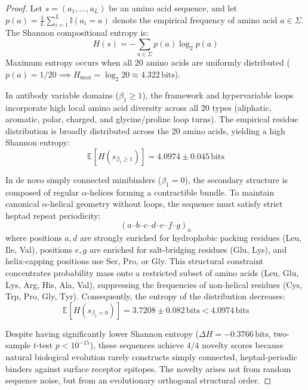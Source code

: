 \begin{proof}
Let $s = (a_1, \dots, a_L)$ be an amino acid sequence, and let $p(a) = \frac{1}{L} \sum_{i=1}^L \mathbb{I}(a_i = a)$ denote the empirical frequency of amino acid $a \in \Sigma$. The Shannon compositional entropy is:
\begin{equation}
    H(s) = -\sum_{a \in \Sigma} p(a) \log_2 p(a)
\end{equation}
Maximum entropy occurs when all 20 amino acids are uniformly distributed ($p(a) = 1/20 \implies H_{\max} = \log_2 20 \approx 4.322\,\text{bits}$).

In antibody variable domains ($\beta_1 \ge 1$), the framework and hypervariable loops incorporate high local amino acid diversity across all 20 types (aliphatic, aromatic, polar, charged, and glycine/proline loop turns). The empirical residue distribution is broadly distributed across the 20 amino acids, yielding a high Shannon entropy:
\begin{equation}
    \mathbb{E}[H(s_{\beta_1 \ge 1})] = 4.0974 \pm 0.045\,\text{bits}
\end{equation}

In de novo simply connected minibinders ($\beta_1 = 0$), the secondary structure is composed of regular $\alpha$-helices forming a contractible bundle. To maintain canonical $\alpha$-helical geometry without loops, the sequence must satisfy strict heptad repeat periodicity:
\begin{equation}
    (a \text{--} b \text{--} c \text{--} d \text{--} e \text{--} f \text{--} g)_n
\end{equation}
where positions $a, d$ are strongly enriched for hydrophobic packing residues (Leu, Ile, Val), positions $e, g$ are enriched for salt-bridging residues (Glu, Lys), and helix-capping positions use Ser, Pro, or Gly. This structural constraint concentrates probability mass onto a restricted subset of amino acids (Leu, Glu, Lys, Arg, His, Ala, Val), suppressing the frequencies of non-helical residues (Cys, Trp, Pro, Gly, Tyr). Consequently, the entropy of the distribution decreases:
\begin{equation}
    \mathbb{E}[H(s_{\beta_1 = 0})] = 3.7208 \pm 0.082\,\text{bits} < 4.0974\,\text{bits}
\end{equation}

Despite having significantly lower Shannon entropy ($\Delta H = -0.3766\,\text{bits}$, two-sample $t$-test $p < 10^{-15}$), these sequences achieve $4/4$ novelty scores because natural biological evolution rarely constructs simply connected, heptad-periodic binders against surface receptor epitopes. The novelty arises not from random sequence noise, but from an evolutionary orthogonal structural order.
\end{proof}

